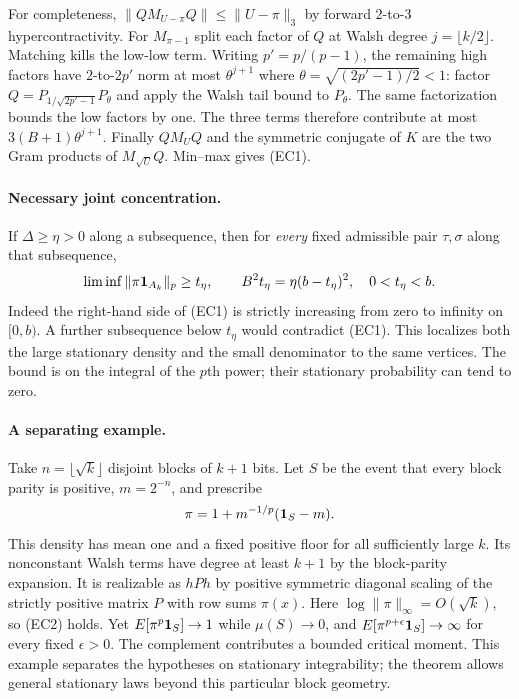 For completeness, $\|QM_{U-\pi}Q\|\le\|U-\pi\|_3$ by forward
$2$-to-$3$ hypercontractivity. For $M_{\pi-1}$ split each factor of $Q$
at Walsh degree $j=\lfloor k/2\rfloor$. Matching kills the low-low term.
Writing $p'=p/(p-1)$, the remaining high factors have $2$-to-$2p'$ norm
at most $\theta^{j+1}$ where $\theta=\sqrt{(2p'-1)/2}<1$: factor
$Q=P_{1/\sqrt{2p'-1}}P_\theta$ and apply the Walsh tail bound to $P_\theta$.
The same factorization bounds the low factors by one. The three terms
therefore contribute at most $3(B+1)\theta^{j+1}$. Finally $QM_UQ$ and
the symmetric conjugate of $K$ are the two Gram products of
$M_{\sqrt U}Q$. Min--max gives (EC1).

\paragraph{Necessary joint concentration.}
If $\Delta\ge\eta>0$ along a subsequence, then for \emph{every} fixed
admissible pair $\tau,\sigma$ along that subsequence,
\[
 \liminf\|\pi{\bf1}_{A_k}\|_p\ge t_\eta,\qquad
 B^2t_\eta=\eta(b-t_\eta)^2,\quad 0<t_\eta<b .
\]
Indeed the right-hand side of (EC1) is strictly increasing from zero to
infinity on $[0,b)$. A further subsequence below $t_\eta$ would contradict
(EC1). This localizes both the large stationary density and the small
denominator to the same vertices. The bound is on the integral of the
$p$th power; their stationary probability can tend to zero.

\paragraph{A separating example.}
Take $n=\lfloor\sqrt{k}\rfloor$ disjoint blocks of $k+1$ bits. Let $S$
be the event that every block parity is positive, $m=2^{-n}$, and prescribe
\[
 \pi=1+m^{-1/p}({\bf1}_S-m).
\]
This density has mean one and a fixed positive floor for all sufficiently
large $k$. Its nonconstant Walsh terms have degree at least $k+1$ by the
block-parity expansion. It is realizable as $hPh$ by positive symmetric
diagonal scaling of the strictly positive matrix $P$ with row sums $\pi(x)$.
Here $\log\|\pi\|_\infty=O(\sqrt{k})$, so (EC2) holds. Yet
$E[\pi^p{\bf1}_S]\to1$ while $\mu(S)\to0$, and
$E[\pi^{p+\epsilon}{\bf1}_S]\to\infty$ for every fixed $\epsilon>0$.
The complement contributes a bounded critical moment. This example
separates the hypotheses on stationary integrability; the theorem allows
general stationary laws beyond this particular block geometry.

